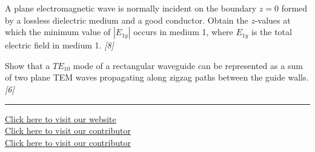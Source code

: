 \documentclass[11pt,a4paper]{article}
\newcommand{\pts}[1]{\hfill   \textit{[#1]}}
\begin{document}
\begin{parts}
  \item A plane electromagnetic wave is normally incident on the boundary $z = 0$ formed by a lossless dielectric medium and a good conductor. Obtain the $z$-values at which the minimum value of $|E_{1y}|$ occurs in medium 1, where $E_{1y}$ is the total electric field in medium 1. \pts{8}
  \item Show that a $TE_{10}$ mode of a rectangular waveguide can be represented as a sum of two plane TEM waves propagating along zigzag paths between the guide walls. \pts{6}
\end{parts}

\vfill
\rule{\linewidth}{0.4pt}

\begin{center}\small
  \href{https://bhu-exam.vercel.app/}{Click here to visit our website}\\[4pt]
  \href{https://me-aryan.vercel.app/}{Click here to visit our contributor}\\[4pt]
  \href{https://quashan-me.vercel.app/}{Click here to visit our contributor}
\end{center}
\end{document}
